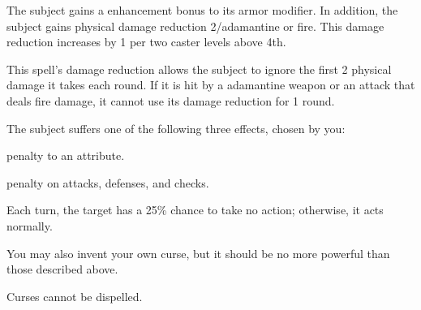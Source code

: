 \spelldur{\durshort}
\begin{spellsuccess}
  The subject gains a  enhancement bonus to its armor modifier. \spellbonusscalingdescription In addition, the subject gains physical damage reduction 2/adamantine or fire. This damage reduction increases by 1 per two caster levels above 4th.
\end{spellsuccess}
\begin{spellnotes}
  This spell's damage reduction allows the subject to ignore the first 2 physical damage it takes each round. If it is hit by a adamantine weapon or an attack that deals fire damage, it cannot use its damage reduction for 1 round.
\end{spellnotes}

\spellrng{\rngclose}
\begin{spellsuccess}
  The subject suffers one of the following three effects, chosen by you:
  \begin{itemize*}
    \item {} penalty to an attribute.
    \item {} penalty on attacks, defenses, and checks.
    \item Each turn, the target has a 25\% chance to take no action; otherwise, it acts normally.
  \end{itemize*}
  \par You may also invent your own curse, but it should be no more powerful than those described above.
\end{spellsuccess}
\begin{spellnotes}
  Curses cannot be dispelled.
\end{spellnotes}

